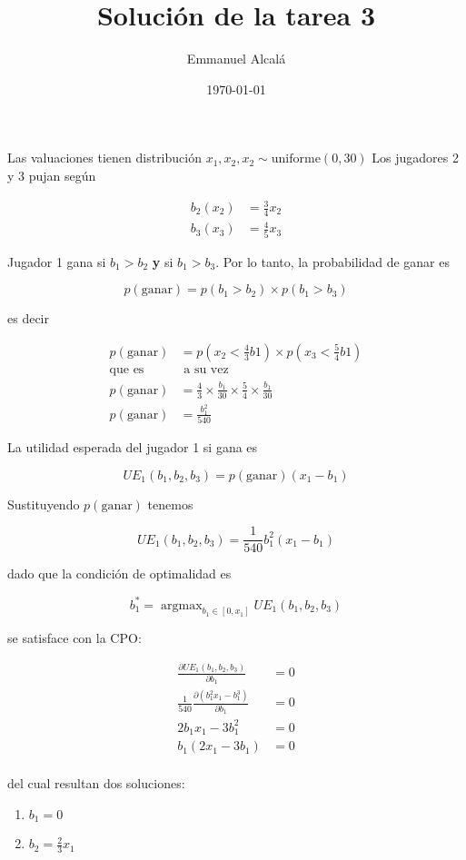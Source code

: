 \documentclass[12pt]{scrartcl} %
\title{Solución de la tarea 3}
\author{Emmanuel Alcalá}
\date{\today}
\DeclareMathOperator*{\argmax}{argmax}
\begin{document}
\maketitle

\begin{Exercise}[name={Respuesta}]

Las valuaciones tienen distribución
$ x_1, x_2, x_2 \sim \text{uniforme}(0, 30) $
Los jugadores 2 y 3 pujan según

\begin{align*}
  b_2(x_2) &= \frac{3}{4}x_2\\
  b_3(x_3) &= \frac{4}{5}x_3
\end{align*}

Jugador 1 gana si $ b_1 > b_2 $ \textbf{y} si $ b_1 > b_3$. Por lo tanto, la probabilidad de ganar es 

\[p(\text{ganar}) = p( b_1 > b_2 ) \times p ( b_1 > b_3 )\]

es decir

\begin{align*}
  p(\text{ganar}) &= p \left( x_2 < \frac{4}{3}b1 \right) \times p \left( x_3 < \frac{5}{4}b1 \right)\\
  \text{que es} & \text{ a su vez}\\
  p(\text{ganar}) &= \frac{4}{3}\times\frac{b_1}{30}\times\frac{5}{4}\times\frac{b_1}{30}\\
  p(\text{ganar}) &= \frac{b_1^2}{540}
\end{align*}

La utilidad esperada del jugador 1 si gana es 

\[UE_1(b_1, b_2, b_3) = p(\text{ganar})(x_1 - b_1)\]

Sustituyendo $ p(\text{ganar}) $ tenemos

\[UE_1(b_1, b_2, b_3) = \frac{1}{540}b_1^2(x_1 - b_1)\]

dado que la condición de optimalidad es

\[b_1^* = \argmax_{b_1 \in [0, x_1]} UE_1(b_1, b_2, b_3)\]

se satisface con la CPO:

\begin{align*}
  \frac{\partial UE_1(b_1, b_2, b_3)}{\partial b_1} &= 0\\
  \frac{1}{540} \frac{\partial (b_1^2x_1 - b_1^3)}{\partial b_1} &=0\\
   2b_1x_1 - 3b_1^2 &= 0\\
   b_1(2x_1 - 3b_1) &= 0\\
\end{align*}

del cual resultan dos soluciones:

\begin{enumerate}
  \item $b_1 = 0$
  \item $b_2 = \frac{2}{3}x_1$
\end{enumerate}

\end{Exercise}
\end{document}
